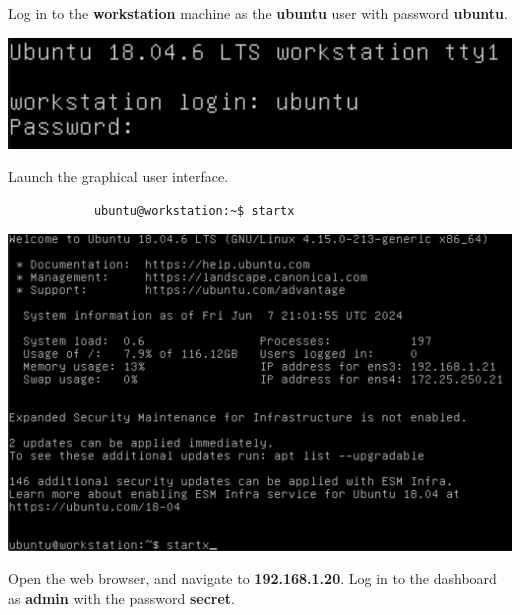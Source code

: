 \documentclass[letterpaper, 12pt]{article}
\begin{document}
\begin{enumerate}
    \begin{labstep}
        Log in to the \textbf{workstation} machine as the \textbf{ubuntu} user with password \textbf{ubuntu}.

        \begin{center}
            \includegraphics[width=\linewidth]{images/part1/step1.png}
        \end{center}
    \end{labstep}

    \begin{labstep}
        Launch the graphical user interface.
        \begin{lstlisting}
            ubuntu@workstation:~$ startx
        \end{lstlisting}

        \begin{center}
            \includegraphics[width=\linewidth]{images/part1/step2.png}
        \end{center}
    \end{labstep}

    \begin{labstep}
        Open the web browser, and navigate to \textbf{192.168.1.20}.
        Log in to the dashboard as \textbf{admin} with the password \textbf{secret}.


\end{labstep}
\end{enumerate}
\end{document}
